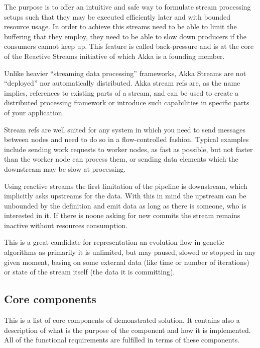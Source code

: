 The purpose is to offer an intuitive and safe way to formulate stream processing setups such that they may be executed efficiently later and with bounded resource usage. In order to achieve this  streams need to be able to limit the buffering that they employ, they need to be able to slow down producers if the consumers cannot keep up. This feature is called back-pressure and is at the core of the Reactive Streams initiative of which Akka is a founding member.

Unlike heavier “streaming data processing” frameworks, Akka Streams are not “deployed” nor automatically distributed. Akka stream refs are, as the name implies, references to existing parts of a stream, and can be used to create a distributed processing framework or introduce such capabilities in specific parts of your application.

Stream refs are well suited for any system in which you need to send messages between nodes and need to do so in a flow-controlled fashion. Typical examples include sending work requests to worker nodes, as fast as possible, but not faster than the worker node can process them, or sending data elements which the downstream may be slow at processing. \cite{stream_refs}

Using reactive streams the first limitation of the pipeline is downstream, which implicitly asks upstreams for the data. With this in mind the upstream can be unbounded by the definition and emit data as long as there is someone, who is interested in it. If there is noone asking for new commits the stream remains inactive without resources consumption. 

This is a great candidate for representation an evolution flow in genetic algorithms as primarily it is unlimited, but may paused, slowed or stopped in any given moment, basing on some external data (like time or number of iterations) or state of the stream itself (the data it is committing).

\subsection{Core components}

This is a list of core components of demonstrated solution. It contains also a description of what is the purpose of the component and how it is implemented. All of the functional requirements are fulfilled in terms of these components.


